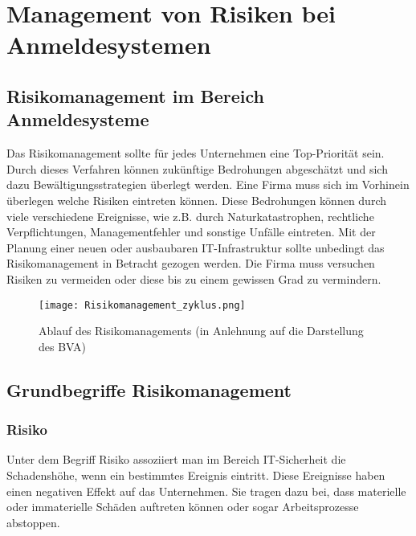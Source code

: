 \chapter{Management von Risiken bei Anmeldesystemen}

\section{Risikomanagement im Bereich Anmeldesysteme}
Das Risikomanagement sollte für jedes Unternehmen eine Top-Priorität sein. Durch dieses Verfahren können zukünftige Bedrohungen abgeschätzt und sich dazu Bewältigungsstrategien überlegt werden. Eine Firma muss sich im Vorhinein überlegen welche Risiken eintreten können. Diese Bedrohungen können durch viele verschiedene Ereignisse, wie z.B. durch Naturkatastrophen, rechtliche Verpflichtungen, Managementfehler und sonstige Unfälle eintreten.
Mit der Planung einer neuen oder ausbaubaren IT-Infrastruktur sollte unbedingt das Risikomanagement in Betracht gezogen werden. Die Firma muss versuchen Risiken zu vermeiden oder diese bis zu einem gewissen Grad zu vermindern. 

\begin{center}
\begin{figure}[h]
    \centering
    \texttt{[image: Risikomanagement\_zyklus.png]}
    \caption{Ablauf des Risikomanagements (in Anlehnung auf die Darstellung des BVA)}
\end{figure}
\end{center}

\newpage

\section{Grundbegriffe Risikomanagement}
\subsection{Risiko}
Unter dem Begriff Risiko assoziiert man im Bereich IT-Sicherheit die Schadenshöhe, wenn ein bestimmtes Ereignis eintritt. Diese Ereignisse haben einen negativen Effekt auf das Unternehmen. Sie tragen dazu bei, dass materielle oder immaterielle Schäden auftreten können oder sogar Arbeitsprozesse abstoppen.
\\

